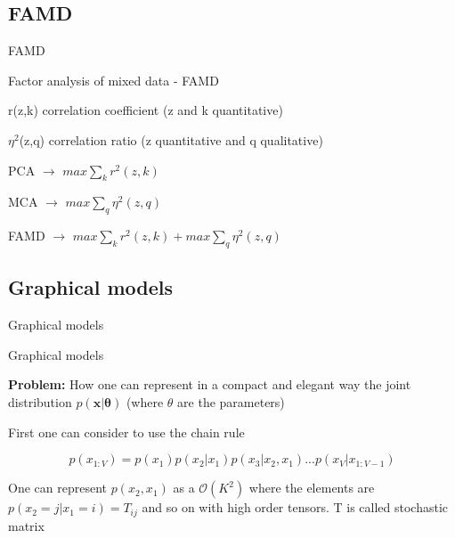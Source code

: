 \documentclass{beamer}
\begin{document}
\subsection{FAMD}
\begin{frame}{}
\begin{center}
{\Huge FAMD}
\end{center}
\end{frame}

\begin{frame}{Factor analysis of mixed data - FAMD}
\begin{center}
r(z,k) correlation coefficient (z and k quantitative) \\
\end{center}
\begin{center}
$\eta^{2}$(z,q) correlation ratio (z quantitative and q qualitative)
\end{center}
\begin{center}
PCA $\rightarrow$ $max\sum_{k}r^{2}(z,k)$
\end{center}
\begin{center}
MCA $\rightarrow$ $max\sum_{q}\eta^{2}(z,q)$
\end{center}
\begin{center}
FAMD $\rightarrow$ $max\sum_{k}r^{2}(z,k)+max\sum_{q}\eta^{2}(z,q)$
\end{center}
\end{frame}




\subsection{Graphical models}
\begin{frame}{}
\begin{center}
{\Huge Graphical models}
\end{center}
\end{frame}

\begin{frame}{Graphical models}
\begin{center}
\textbf{Problem:} How one can represent in a compact and elegant way the joint distribution $p(\textbf{x}|\boldsymbol{\theta})$ (where $\theta$ are the parameters)
\end{center}
\begin{center}
First one can consider to use the chain rule
\end{center}
\begin{equation}
p(x_{1:V})=p(x_{1})p(x_{2}|x_{1})p(x_{3}|x_{2},x_{1})...p(x_{V}|x_{1:V-1})
\end{equation}
\begin{center}
One can represent $p(x_{2},x_{1})$ as a $\mathcal{O}(K^{2})$ where the elements are $p(x_{2}=j|x_{1}=i)=T_{ij}$ and so on with high order tensors. T is called stochastic matrix
\end{center}
\end{frame}
\end{document}
